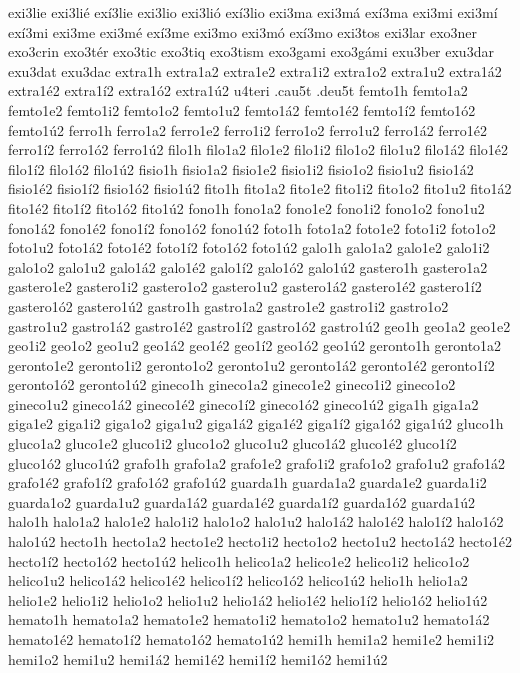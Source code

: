{exi3lie
exi3lié
exí3lie
exi3lio
exi3lió
exí3lio
exi3ma
exi3má
exí3ma
exi3mi
exi3mí
exí3mi
exi3me
exi3mé
exí3me
exi3mo
exi3mó
exí3mo
exi3tos
exi3lar
exo3ner
exo3crin
exo3tér
exo3tic
exo3tiq
exo3tism
exo3gami
exo3gámi
exu3ber
exu3dar
exu3dat
exu3dac
extra1h
extra1a2 extra1e2 extra1i2 extra1o2 extra1u2
extra1á2 extra1é2 extra1í2 extra1ó2 extra1ú2
u4teri
.cau5t
.deu5t
femto1h
femto1a2 femto1e2 femto1i2 femto1o2 femto1u2
femto1á2 femto1é2 femto1í2 femto1ó2 femto1ú2
ferro1h
ferro1a2 ferro1e2 ferro1i2 ferro1o2 ferro1u2
ferro1á2 ferro1é2 ferro1í2 ferro1ó2 ferro1ú2
filo1h
filo1a2 filo1e2 filo1i2 filo1o2 filo1u2
filo1á2 filo1é2 filo1í2 filo1ó2 filo1ú2
fisio1h
fisio1a2 fisio1e2 fisio1i2 fisio1o2 fisio1u2
fisio1á2 fisio1é2 fisio1í2 fisio1ó2 fisio1ú2
fito1h
fito1a2 fito1e2 fito1i2 fito1o2 fito1u2
fito1á2 fito1é2 fito1í2 fito1ó2 fito1ú2
fono1h
fono1a2 fono1e2 fono1i2 fono1o2 fono1u2
fono1á2 fono1é2 fono1í2 fono1ó2 fono1ú2
foto1h
foto1a2 foto1e2 foto1i2 foto1o2 foto1u2
foto1á2 foto1é2 foto1í2 foto1ó2 foto1ú2
galo1h
galo1a2 galo1e2 galo1i2 galo1o2 galo1u2
galo1á2 galo1é2 galo1í2 galo1ó2 galo1ú2
gastero1h
gastero1a2 gastero1e2 gastero1i2 gastero1o2 gastero1u2
gastero1á2 gastero1é2 gastero1í2 gastero1ó2 gastero1ú2
gastro1h
gastro1a2 gastro1e2 gastro1i2 gastro1o2 gastro1u2
gastro1á2 gastro1é2 gastro1í2 gastro1ó2 gastro1ú2
geo1h
geo1a2 geo1e2 geo1i2 geo1o2 geo1u2
geo1á2 geo1é2 geo1í2 geo1ó2 geo1ú2
geronto1h
geronto1a2 geronto1e2 geronto1i2 geronto1o2 geronto1u2
geronto1á2 geronto1é2 geronto1í2 geronto1ó2 geronto1ú2
gineco1h
gineco1a2 gineco1e2 gineco1i2 gineco1o2 gineco1u2
gineco1á2 gineco1é2 gineco1í2 gineco1ó2 gineco1ú2
giga1h
giga1a2 giga1e2 giga1i2 giga1o2 giga1u2
giga1á2 giga1é2 giga1í2 giga1ó2 giga1ú2
gluco1h
gluco1a2 gluco1e2 gluco1i2 gluco1o2 gluco1u2
gluco1á2 gluco1é2 gluco1í2 gluco1ó2 gluco1ú2
grafo1h
grafo1a2 grafo1e2 grafo1i2 grafo1o2 grafo1u2
grafo1á2 grafo1é2 grafo1í2 grafo1ó2 grafo1ú2
guarda1h
guarda1a2 guarda1e2 guarda1i2 guarda1o2 guarda1u2
guarda1á2 guarda1é2 guarda1í2 guarda1ó2 guarda1ú2
halo1h
halo1a2 halo1e2 halo1i2 halo1o2 halo1u2
halo1á2 halo1é2 halo1í2 halo1ó2 halo1ú2
hecto1h
hecto1a2 hecto1e2 hecto1i2 hecto1o2 hecto1u2
hecto1á2 hecto1é2 hecto1í2 hecto1ó2 hecto1ú2
helico1h
helico1a2 helico1e2 helico1i2 helico1o2 helico1u2
helico1á2 helico1é2 helico1í2 helico1ó2 helico1ú2
helio1h
helio1a2 helio1e2 helio1i2 helio1o2 helio1u2
helio1á2 helio1é2 helio1í2 helio1ó2 helio1ú2
hemato1h
hemato1a2 hemato1e2 hemato1i2 hemato1o2 hemato1u2
hemato1á2 hemato1é2 hemato1í2 hemato1ó2 hemato1ú2
hemi1h
hemi1a2 hemi1e2 hemi1i2 hemi1o2 hemi1u2
hemi1á2 hemi1é2 hemi1í2 hemi1ó2 hemi1ú2
}
